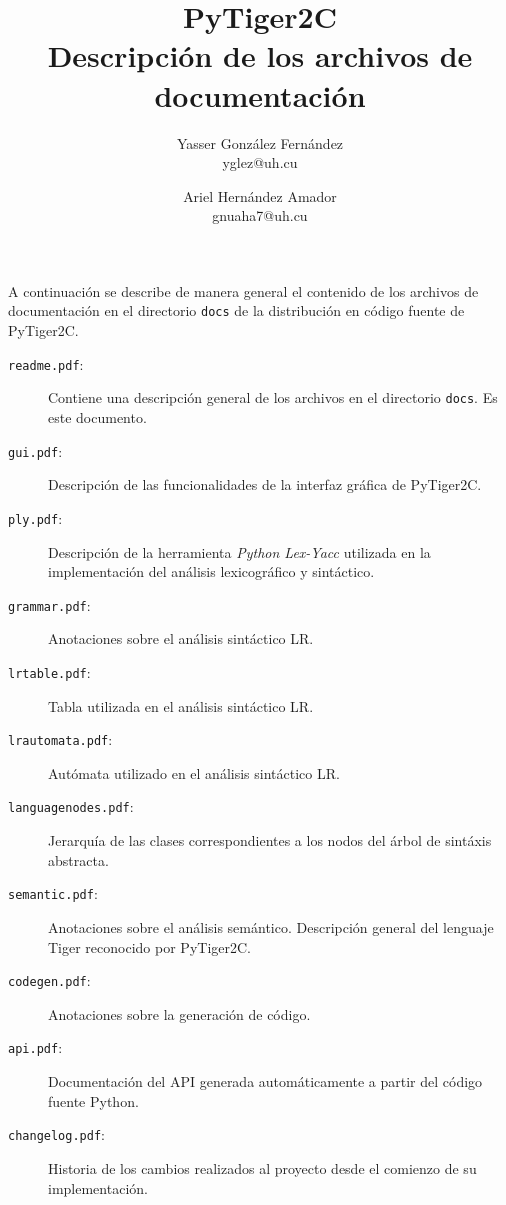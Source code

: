 \documentclass{article}
\title{
    \LARGE{PyTiger2C} \\
    \Large{Descripción de los archivos de documentación}
}
\author{
    Yasser González Fernández \\
    \small{yglez@uh.cu}
    \and
    Ariel Hernández Amador \\
    \small{gnuaha7@uh.cu}
}
\date{}
\begin{document}
\maketitle

\thispagestyle{empty}

\newpage

\setcounter{page}{1}

A continuación se describe de manera general el contenido de los archivos de
documentación en el directorio \texttt{docs} de la distribución en código
fuente de PyTiger2C.

\begin{description}
\item[\texttt{readme.pdf}:] Contiene una descripción general de los archivos en
  el directorio \texttt{docs}. Es este documento.

\item[\texttt{gui.pdf}:] Descripción de las funcionalidades de la interfaz
  gráfica de PyTiger2C.

\item[\texttt{ply.pdf}:] Descripción de la herramienta \emph{Python Lex-Yacc}
  utilizada en la implementación del análisis lexicográfico y sintáctico.

\item[\texttt{grammar.pdf}:] Anotaciones sobre el análisis sintáctico LR.

\item[\texttt{lrtable.pdf}:] Tabla utilizada en el análisis sintáctico LR.

\item[\texttt{lrautomata.pdf}:] Autómata utilizado en el análisis sintáctico LR.

\item[\texttt{languagenodes.pdf}:] Jerarquía de las clases correspondientes
  a los nodos del árbol de sintáxis abstracta.

\item[\texttt{semantic.pdf}:] Anotaciones sobre el análisis semántico.
  Descripción general del lenguaje Tiger reconocido por PyTiger2C.

\item[\texttt{codegen.pdf}:] Anotaciones sobre la generación de código.

\item[\texttt{api.pdf}:] Documentación del API generada automáticamente a
  partir del código fuente Python.

\item[\texttt{changelog.pdf}:] Historia de los cambios realizados al proyecto
  desde el comienzo de su implementación.

\end{description}
\end{document}
